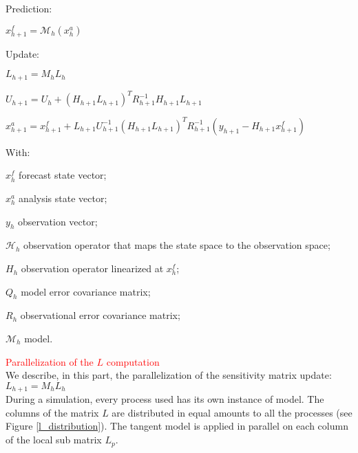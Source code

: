 \documentclass{tufte-book}
\begin{document}
\begin{DoxyEnumerate}
\item \-Prediction\-:
\begin{DoxyItemize}
\item $ x_{h+1}^f = \mathcal{M}_{h}(x_{h}^{a})$\par

\end{DoxyItemize}
\item \-Update\-:
\begin{DoxyItemize}
\item $ L_{h+1} = M_{h}L_h$\par

\item $ U_{h+1} = U_h + (H_{h+1}L_{h+1})^T R_{h+1}^{-1} H_{h+1}L_{h+1}$\par

\item $ x_{h+1}^a = x_{h+1}^f + L_{h+1}U_{h+1}^{-1}(H_{h+1}L_{h+1})^T R_{h+1}^{-1} (y_{h+1}-H_{h+1}x_{h+1}^f)$\par

\end{DoxyItemize}
\end{DoxyEnumerate}\-With\-: \par
 $x_h^f$ forecast state vector; \par
 $x_h^a$ analysis state vector; \par
 $y_h$ observation vector; \par
 $\mathcal{H}_h$ observation operator that maps the state space to the observation space; \par
 $H_h$ observation operator linearized at $x^f_h$; \par
 $Q_h$ model error covariance matrix; \par
 $R_h$ observational error covariance matrix; \par
 $\mathcal{M}_h$ model.\par



 \par \textcolor{red}{Parallelization of the $L$ computation}\\


We describe, in this part, the parallelization of the sensitivity matrix update:\\
 $ L_{h+1} = M_{h}L_h$\\

 During a simulation, every process used has its own instance of model. The columns of the matrix $L$ are distributed in equal amounts to all the processes (see Figure \ref{l_distribution}). The tangent model is applied in parallel on each column of the local sub matrix $L_p$.
\end{document}
